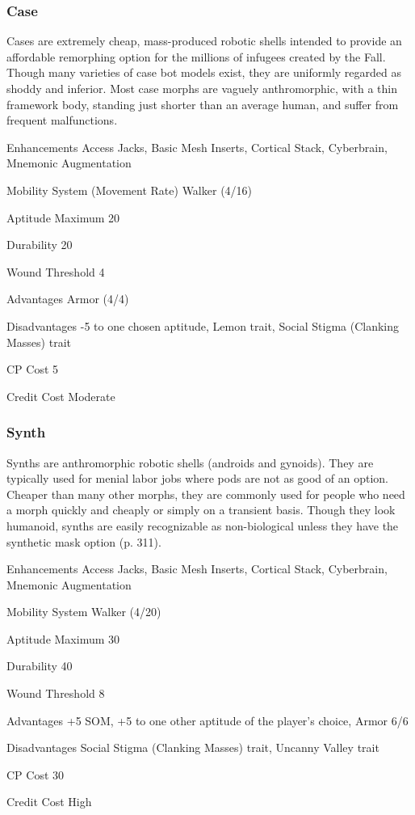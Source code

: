 \subsubsection{Case}
Cases are extremely cheap, mass-produced robotic shells intended to provide an
affordable remorphing option for the millions of infugees created by the
Fall. Though many varieties of case bot models exist, they are uniformly
regarded as shoddy and inferior. Most case morphs are vaguely anthromorphic,
with a thin framework body, standing just shorter than an average human, and
suffer from frequent malfunctions.

\begin{description*}
\item[Enhancements] Access Jacks, Basic Mesh Inserts, Cortical Stack,
  Cyberbrain, Mnemonic Augmentation
\item[Mobility System] (Movement Rate) Walker (4/16) 
\item[Aptitude Maximum] 20 
\item[Durability] 20 
\item[Wound Threshold] 4 
\item[Advantages] Armor (4/4) 
\item[Disadvantages] -5 to one chosen aptitude, Lemon trait, Social Stigma
  (Clanking Masses) trait
\item[CP Cost] 5 
\item[Credit Cost] Moderate 
\end{description*}

\subsubsection{Synth}
Synths are anthromorphic robotic shells (androids and gynoids). They are
typically used for menial labor jobs where pods are not as good of an option.
Cheaper than many other morphs, they are commonly used for people who need a
morph quickly and cheaply or simply on a transient basis. Though they look
humanoid, synths are easily recognizable as non-biological unless they have the
synthetic mask option (p. 311).

\begin{description*}
\item[Enhancements] Access Jacks, Basic Mesh Inserts, Cortical Stack,
  Cyberbrain, Mnemonic Augmentation
\item[Mobility System] Walker (4/20) 
\item[Aptitude Maximum] 30 
\item[Durability] 40 
\item[Wound Threshold] 8 
\item[Advantages] +5 SOM, +5 to one other aptitude of the player’s choice,
  Armor 6/6
\item[Disadvantages] Social Stigma (Clanking Masses) trait, Uncanny Valley
  trait
\item[CP Cost] 30 
\item[Credit Cost] High 
\end{description*}

